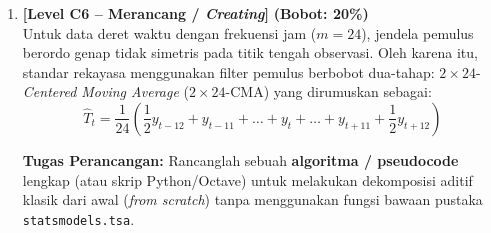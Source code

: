 \documentclass[11pt,a4paper]{article}
\begin{document}
\begin{enumerate}[leftmargin=1.5em, label=\textbf{Soal \arabic*.}]
    \textbf{Tugas Evaluasi:}
    \begin{enumerate}[label=\alph*.]
        \item Evaluasilah kelemahan fatal pendekatan Kelompok A, terutama terkait estimasi komponen musiman $\hat{S}_t$ pada malam hari yang dapat menghasilkan nilai daya negatif yang tidak masuk akal secara fisik!
        \item Mengapa pendekatan \textit{Clear-Sky Index} yang diterapkan Kelompok B jauh lebih superior secara keteknikan dalam mengisolasi komponen tren dan musiman matahari?
    \end{enumerate}

    \vspace{0.4cm}

    \item \textbf{[Level C6 -- Merancang / \textit{Creating}]} \hfill \textbf{(Bobot: 20\%)} \\
    Untuk data deret waktu dengan frekuensi jam ($m=24$), jendela pemulus berordo genap tidak simetris pada titik tengah observasi. Oleh karena itu, standar rekayasa menggunakan filter pemulus berbobot dua-tahap: $2 \times 24$-\textit{Centered Moving Average} ($2 \times 24$-CMA) yang dirumuskan sebagai:
    \begin{equation}
        \hat{T}_t = \frac{1}{24} \left( \frac{1}{2}y_{t-12} + y_{t-11} + \dots + y_t + \dots + y_{t+11} + \frac{1}{2}y_{t+12} \right)
    \end{equation}

    \textbf{Tugas Perancangan:}
    Rancanglah sebuah \textbf{algoritma / pseudocode} lengkap (atau skrip Python/Octave) untuk melakukan dekomposisi aditif klasik dari awal (\textit{from scratch}) tanpa menggunakan fungsi bawaan pustaka \texttt{statsmodels.tsa}.
    

\end{enumerate}
\end{document}
